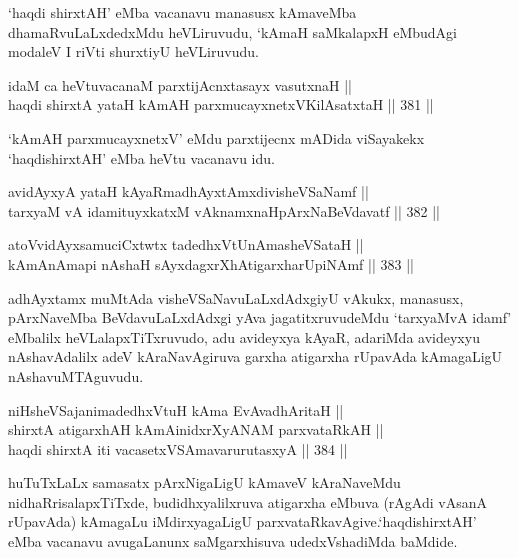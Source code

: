 \begin{artha}
`haqdi shirxtAH' eMba vacanavu manasusx kAmaveMba dhamaRvuLaLxdedxMdu
heVLiruvudu, `kAmaH saMkalapxH eMbudAgi modaleV I riVti shurxtiyU
heVLiruvudu.
\end{artha}

\begin{shl}
idaM ca heVtuvacanaM parxtijAcnxtasayx vasutxnaH || \\
haqdi shirxtA yataH kAmAH parxmucayxnetxV\s KilAsatxtaH \hfill || 381 ||  
\end{shl}

\begin{artha}
`kAmAH parxmucayxnetxV' eMdu parxtijecnx mADida viSayakekx\break
`haqdishirxtAH' eMba heVtu vacanavu idu.
\end{artha}

\begin{shl}
avidAyxyA yataH kAyaRmadhAyxtAmxdivisheVSaNamf || \\
tarxyaM vA idamituyxkatxM vAknamxnaHpArxNaBeVdavatf \hfill || 382 ||  
\end{shl}

\begin{shl}
atoV\s vidAyxsamuciCxtwtx tadedhxVtUnAmasheVSataH || \\
kAmAnAmapi nAshaH sAyxdagxrXhAtigarxharUpiNAmf \hfill || 383 ||  
\end{shl}

\begin{artha}
adhAyxtamx muMtAda visheVSaNavuLaLxdAdxgiyU vAkukx, manasusx,
pArxNaveMba BeVdavuLaLxdAdxgi yAva jagatitxruvudeMdu `tarxyaMvA idamf'
eMbalilx heVLalapxTiTxruvudo, adu avideyxya kAyaR, adariMda avideyxyu
nAshavAdalilx adeV kAraNavAgiruva garxha atigarxha rUpavAda
kAmagaLigU nAshavuMTAguvudu.
\end{artha}

\begin{shl}
niHsheVSajanimadedhxVtuH kAma EvAvadhAritaH || \\
shirxtA atigarxhAH kAmAinidxrXyANAM parxvataRkAH || \\
haqdi shirxtA iti vacasetxVSAmavarurutasxyA \hfill || 384 ||  
\end{shl}

\begin{artha}
huTuTxLaLx samasatx pArxNigaLigU kAmaveV kAraNaveMdu\break
nidhaRrisalapxTiTxde, budidhxyalilxruva atigarxha eMbuva (rAgAdi
vAsanA rUpavAda) kAmagaLu iMdirxyagaLigU
parxvataRkavAgive.\break `haqdishirxtAH' eMba vacanavu avugaLanunx
saMgarxhisuva udedxVshadiMda baMdide. 
\end{artha}


